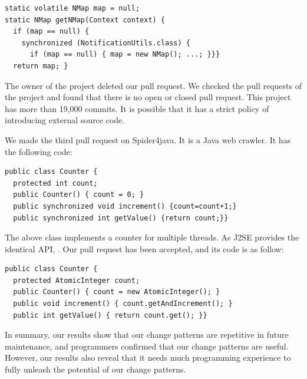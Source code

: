 \begin{lstlisting}
static volatile NMap map = null;
static NMap getNMap(Context context) {
  if (map == null) {
    synchronized (NotificationUtils.class) {
      if (map == null) { map = new NMap(); ...; }}}
  return map; }
\end{lstlisting}

The owner of the project deleted our pull request. We checked the pull requests of the project and found that there is no open or closed pull request. This project has more than 19,000 commits. It is possible that it has a strict policy of introducing external source code.



We made the third pull request on Spider4java. It is a Java web crawler. It has the following code:

\begin{lstlisting}
public class Counter {
  protected int count;
  public Counter() { count = 0; }
  public synchronized void increment() {count=count+1;}
  public synchronized int getValue() {return count;}}
\end{lstlisting}

The above class implements a counter for multiple threads. As J2SE provides the identical API, . Our pull request has been accepted, and its code is as follow:

\begin{lstlisting}
public class Counter {
  protected AtomicInteger count;
  public Counter() { count = new AtomicInteger(); }
  public void increment() { count.getAndIncrement(); }
  public int getValue() { return count.get(); }}
\end{lstlisting}





In summary, our results show that our change patterns are repetitive in future maintenance, and programmers confirmed that our change patterns are useful. However, our results also reveal that it needs much programming experience to fully unleash the potential of our change patterns.




